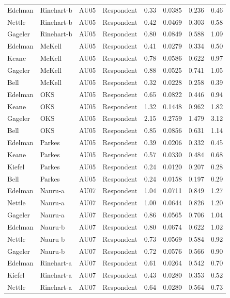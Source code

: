 \documentclass{monashthesis}
\begin{document}
\begin{center}
\begin{longtable}{llllllll}
Edelman & Rinehart-b & AU05 & Respondent & 0.33 & 0.0385 & 0.236 & 0.46 \\
Nettle & Rinehart-b & AU05 & Respondent & 0.42 & 0.0469 & 0.303 & 0.58 \\
Gageler & Rinehart-b & AU05 & Respondent & 0.80 & 0.0849 & 0.588 & 1.09 \\
Edelman & McKell & AU05 & Respondent & 0.41 & 0.0279 & 0.334 & 0.50 \\
Keane & McKell & AU05 & Respondent & 0.78 & 0.0586 & 0.622 & 0.97 \\
Gageler & McKell & AU05 & Respondent & 0.88 & 0.0525 & 0.741 & 1.05 \\
Bell & McKell & AU05 & Respondent & 0.32 & 0.0228 & 0.258 & 0.39 \\
Edelman & OKS & AU05 & Respondent & 0.65 & 0.0822 & 0.446 & 0.94 \\
Keane & OKS & AU05 & Respondent & 1.32 & 0.1448 & 0.962 & 1.82 \\
Gageler & OKS & AU05 & Respondent & 2.15 & 0.2759 & 1.479 & 3.12 \\
Bell & OKS & AU05 & Respondent & 0.85 & 0.0856 & 0.631 & 1.14 \\
Edelman & Parkes & AU05 & Respondent & 0.39 & 0.0206 & 0.332 & 0.45 \\
Keane & Parkes & AU05 & Respondent & 0.57 & 0.0330 & 0.484 & 0.68 \\
Kiefel & Parkes & AU05 & Respondent & 0.24 & 0.0120 & 0.207 & 0.28 \\
Bell & Parkes & AU05 & Respondent & 0.24 & 0.0158 & 0.197 & 0.29 \\
Edelman & Nauru-a & AU07 & Respondent & 1.04 & 0.0711 & 0.849 & 1.27 \\
Nettle & Nauru-a & AU07 & Respondent & 1.00 & 0.0644 & 0.826 & 1.20 \\
Gageler & Nauru-a & AU07 & Respondent & 0.86 & 0.0565 & 0.706 & 1.04 \\
Edelman & Nauru-b & AU07 & Respondent & 0.80 & 0.0674 & 0.622 & 1.02 \\
Nettle & Nauru-b & AU07 & Respondent & 0.73 & 0.0569 & 0.584 & 0.92 \\
Gageler & Nauru-b & AU07 & Respondent & 0.72 & 0.0576 & 0.566 & 0.90 \\
Edelman & Rinehart-a & AU07 & Respondent & 0.61 & 0.0264 & 0.542 & 0.70 \\
Kiefel & Rinehart-a & AU07 & Respondent & 0.43 & 0.0280 & 0.353 & 0.52 \\
Nettle & Rinehart-a & AU07 & Respondent & 0.64 & 0.0280 & 0.564 & 0.73 \\

\end{longtable}
\end{center}
\end{document}

